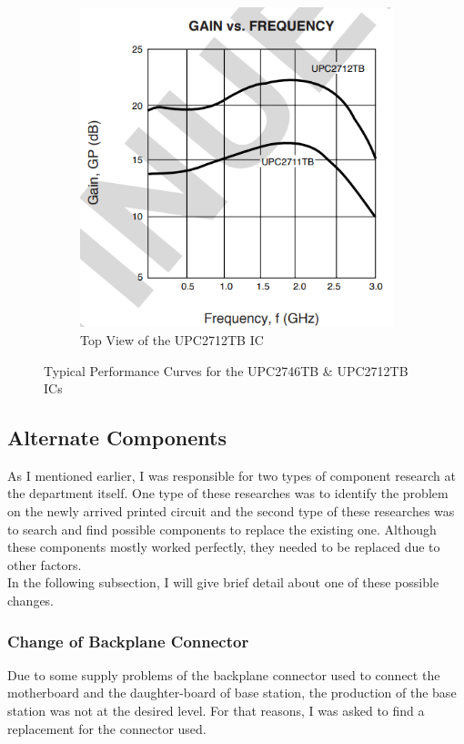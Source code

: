 \begin{figure}[H]
\begin{subfigure}{.5\textwidth}
		\includegraphics[width=0.45\unitlength]{2712_perf}
  		\caption{\label{fig:2712perf}Top View of the UPC2712TB IC}
	\end{subfigure}
\caption{\label{fig:274612perf} Typical Performance Curves for the UPC2746TB \& UPC2712TB ICs   }
\end{figure}	

\newpage
\subsection{Alternate Components}
\- \indent
	As I mentioned earlier, I was responsible for two types of component research at the department itself. One type of these researches was to identify the problem on the newly arrived printed circuit and the second type of these researches was to search and find possible components to replace the existing one. Although these components mostly worked perfectly, they needed to be replaced due to other factors. \\
	
	In the following subsection, I will give brief detail about one of these possible changes.
	
\subsubsection*{Change of Backplane Connector}
\- \indent
	Due to some supply problems of the backplane connector used to connect the motherboard and the daughter-board of base station, the production of the base station was not at the desired level. For that reasons, I was asked to find a replacement for the connector used.\\
	
